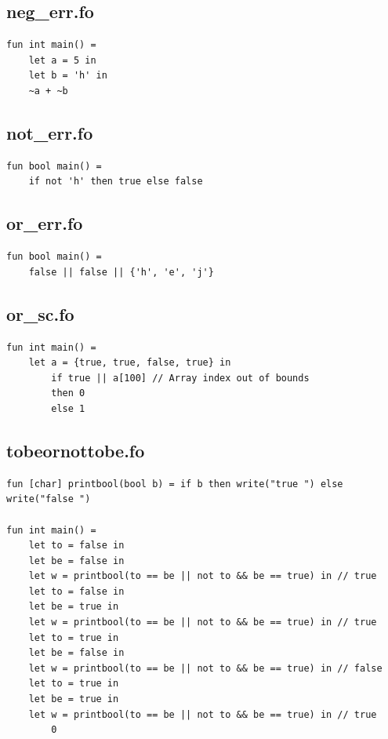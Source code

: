 \documentclass[11pt]{article}
\begin{document}
    \subsection{neg\_err.fo}
    \begin{lstlisting}[basicstyle=\small]
fun int main() =
    let a = 5 in
    let b = 'h' in
    ~a + ~b
    \end{lstlisting}

    \subsection{not\_err.fo}
    \begin{lstlisting}[basicstyle=\small]
fun bool main() =
    if not 'h' then true else false
    \end{lstlisting}

    \subsection{or\_err.fo}
    \begin{lstlisting}[basicstyle=\small]
fun bool main() =
    false || false || {'h', 'e', 'j'}
    \end{lstlisting}

    \subsection{or_sc.fo}
    \begin{lstlisting}[basicstyle=\small]
fun int main() =
    let a = {true, true, false, true} in
        if true || a[100] // Array index out of bounds
        then 0
        else 1
    \end{lstlisting}

    \subsection{tobeornottobe.fo}
    \begin{lstlisting}[basicstyle=\small]
fun [char] printbool(bool b) = if b then write("true ") else write("false ")

fun int main() =
    let to = false in
    let be = false in
    let w = printbool(to == be || not to && be == true) in // true
    let to = false in
    let be = true in
    let w = printbool(to == be || not to && be == true) in // true
    let to = true in
    let be = false in
    let w = printbool(to == be || not to && be == true) in // false
    let to = true in
    let be = true in
    let w = printbool(to == be || not to && be == true) in // true
        0
    \end{lstlisting}
\end{document}
